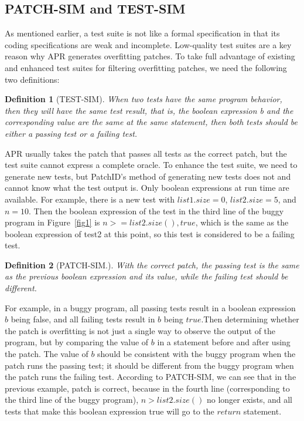 \documentclass[sn-basic]{sn-jnl}
\theoremstyle{thmstyleone}
\theoremstyle{thmstyletwo}
\theoremstyle{thmstylethree}
\newtheorem{definition}{Definition}
\begin{document}
\subsection{PATCH-SIM and TEST-SIM}
As mentioned earlier, a test suite is not like a formal specification in that its coding specifications are weak and incomplete. Low-quality test suites are a key reason why APR generates overfitting patches. To take full advantage of existing and enhanced test suites for filtering overfitting patches, we need the following two definitions:
\begin{definition}[TEST-SIM]
	When two tests have the same program behavior, then they will have the same test result, that is, the boolean expression b and the corresponding value are the same at the same statement, then both tests should be either a passing test or a failing test.  
\end{definition}
APR usually takes the patch that passes all tests as the correct patch, but the test suite cannot express a complete oracle. To enhance the test suite, we need to generate new tests, but PatchID's method of generating new tests does not and cannot know what the test output is. Only boolean expressions at run time are available. For example, there is a new test with $list1.size = 0$, $list 2.size = 5$, and $n = 10$. Then the boolean expression of the test in the third line of the buggy program in Figure~\ref{fig1} is $n > = list2.size(),true$, which is the same as the boolean expression of test2 at this point, so this test is considered to be a failing test.
\begin{definition}[PATCH-SIM.]
With the correct patch, the passing test is the same as the previous boolean expression and its value, while the failing test should be different. 
\end{definition}
For example, in a buggy program, all passing tests result in a boolean expression $b$ being false, and all failing tests result in $b$ being $true$.Then determining whether the patch is overfitting is not just a single way to observe the output of the program, but by comparing the value of $b$ in a statement before and after using the patch. The value of $b$ should be consistent with the buggy program when the patch runs the passing test; it should be different from the buggy program when the patch runs the failing test. According to PATCH-SIM, we can see that in the previous example, patch is correct, because in the fourth line (corresponding to the third line of the buggy program), $n > list 2.size()$ no longer exists, and all tests that make this boolean expression true will go to the $return$ statement.
\end{document}
